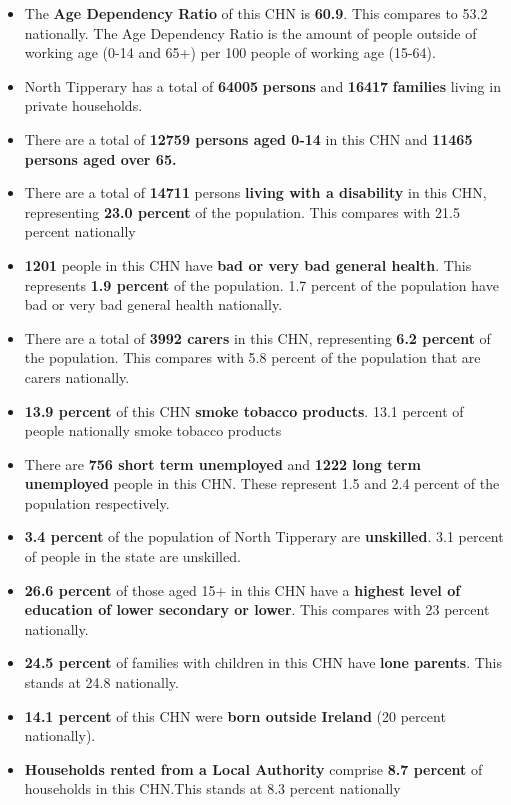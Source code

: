 \documentclass{article}
\begin{document}
\begin{itemize}

\item The \textbf{Age Dependency Ratio} of this CHN is  \textbf{60.9}. This compares to 53.2 nationally. The Age Dependency Ratio is the amount of people outside of working age (0-14 and 65+) per 100 people of working age (15-64). 

\item North Tipperary has a total of \textbf{\num{64005}} \textbf{persons} and  \textbf{\num{16417}} \textbf{families} living in private households.

\item There are a total of \textbf{\num{12759} persons aged 0-14} in this CHN and \textbf{\num{11465} persons aged over 65.} 

\item There are a total of \textbf{\num{14711}} persons \textbf{living with a disability} in this CHN, representing \textbf{23.0 percent} of the population. This compares with  21.5 percent nationally

\item \textbf{\num{1201}} people in this CHN have \textbf{bad or very bad general health}. This represents \textbf{1.9 percent} of the population. 1.7 percent of the population have bad or very bad general health nationally. 

\item There are a total of \textbf{\num{3992} carers} in this CHN, representing \textbf{6.2 percent} of the population. This compares with 5.8 percent of the population that are carers nationally. 

\item \textbf{13.9 percent} of this CHN \textbf{smoke tobacco products}. 13.1 percent of people nationally smoke tobacco products

\item There are \textbf{\num{756} short term unemployed} and \textbf{\num{1222} long term unemployed} people in this CHN. These represent 1.5 and 2.4 percent of the population respectively.

\item  \textbf{3.4 percent} of the population of North Tipperary are \textbf{unskilled}. 3.1 percent of people in the state are unskilled.

\item \textbf{26.6 percent} of those aged 15+ in this CHN have a \textbf{highest level of education of lower secondary or lower}. This compares with 23 percent nationally. 

\item \textbf{24.5 percent} of families with children in this CHN have \textbf{lone parents}. This stands at 24.8 nationally.

\item \textbf{14.1 percent} of this CHN were \textbf{born outside Ireland} (20 percent nationally).

\item \textbf{Households rented from a Local Authority} comprise \textbf{8.7 percent} of households in this CHN.This stands at 8.3 percent nationally

\end{itemize}
\end{document}
